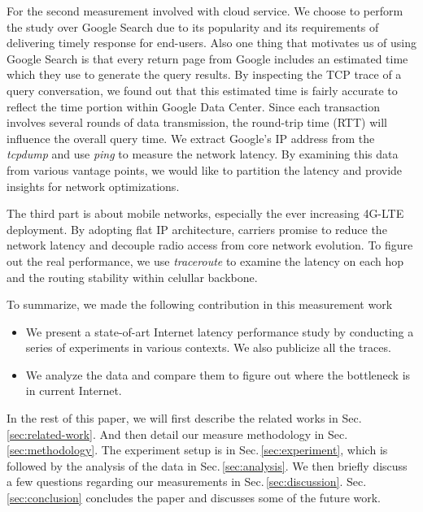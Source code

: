 For the second measurement involved with cloud service. We choose to perform the study over Google Search due to its popularity and its requirements of delivering timely response for end-users. Also one thing that motivates us of using Google Search is that every return page from Google includes an estimated time which they use to generate the query results. By inspecting the TCP trace of a query conversation, we found out that this estimated time is fairly accurate to reflect the time portion within Google Data Center. Since each transaction involves several rounds of data transmission, the round-trip time (RTT) will influence the overall query time. We extract Google's IP address from the {\it tcpdump} and use {\it ping} to measure the network latency. By examining this data from various vantage points, we would like to partition the latency and provide insights for network optimizations.

The third part is about mobile networks, especially the ever increasing 4G-LTE deployment. By adopting flat IP architecture, carriers promise to reduce the network latency and decouple radio access from core network evolution. To figure out the real performance, we use {\it traceroute} to examine the latency on each hop and the routing stability within celullar backbone. 

To summarize, we made the following contribution in this measurement work
\begin{itemize}
\item We present a state-of-art Internet latency performance study by conducting a series of experiments in various contexts. We also publicize all the traces.
\item We analyze the data and compare them to figure out where the bottleneck is in current Internet.
\end{itemize}

In the rest of this paper, we will first describe the related works in Sec.\,\ref{sec:related-work}. And then detail our measure methodology in Sec.\,\ref{sec:methodology}. The experiment setup is in Sec.\,\ref{sec:experiment}, which is followed by the analysis of the data in Sec.\,\ref{sec:analysis}. We then briefly discuss a few questions regarding our measurements in Sec.\,\ref{sec:discussion}. Sec.\,\ref{sec:conclusion} concludes the paper and discusses some of the future work.



